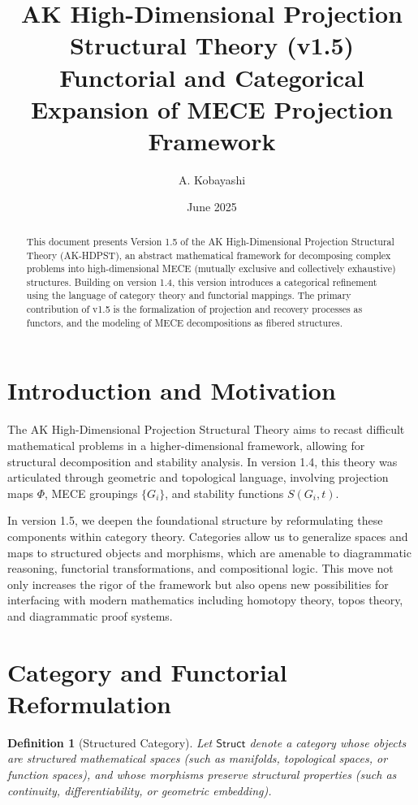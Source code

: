 \documentclass[11pt]{article}
\title{AK High-Dimensional Projection Structural Theory (v1.5)\\
Functorial and Categorical Expansion of MECE Projection Framework}
\author{A. Kobayashi}
\date{June 2025}
\newtheorem{definition}{Definition}[section]
\begin{document}
\maketitle

\begin{abstract}
This document presents Version 1.5 of the AK High-Dimensional Projection Structural Theory (AK-HDPST), an abstract mathematical framework for decomposing complex problems into high-dimensional MECE (mutually exclusive and collectively exhaustive) structures. Building on version 1.4, this version introduces a categorical refinement using the language of category theory and functorial mappings. The primary contribution of v1.5 is the formalization of projection and recovery processes as functors, and the modeling of MECE decompositions as fibered structures.
\end{abstract}

\section{Introduction and Motivation}

The AK High-Dimensional Projection Structural Theory aims to recast difficult mathematical problems in a higher-dimensional framework, allowing for structural decomposition and stability analysis. In version 1.4, this theory was articulated through geometric and topological language, involving projection maps \( \Phi \), MECE groupings \( \{G_i\} \), and stability functions \( S(G_i, t) \).

In version 1.5, we deepen the foundational structure by reformulating these components within category theory. Categories allow us to generalize spaces and maps to structured objects and morphisms, which are amenable to diagrammatic reasoning, functorial transformations, and compositional logic. This move not only increases the rigor of the framework but also opens new possibilities for interfacing with modern mathematics including homotopy theory, topos theory, and diagrammatic proof systems.

\section{Category and Functorial Reformulation}

\begin{definition}[Structured Category]
Let \( \mathsf{Struct} \) denote a category whose objects are structured mathematical spaces (such as manifolds, topological spaces, or function spaces), and whose morphisms preserve structural properties (such as continuity, differentiability, or geometric embedding).
\end{definition}
\end{document}
